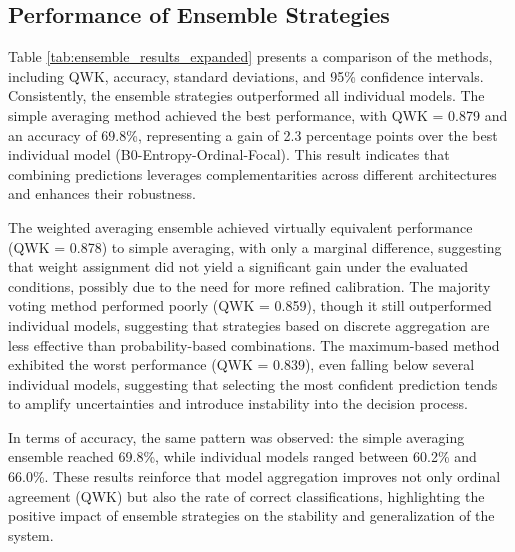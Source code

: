 \subsection{Performance of Ensemble Strategies}

Table \ref{tab:ensemble_results_expanded} presents a comparison of the methods, including QWK, accuracy, standard deviations, and 95\% confidence intervals. Consistently, the ensemble strategies outperformed all individual models. The simple averaging method achieved the best performance, with QWK = 0.879 and an accuracy of 69.8\%, representing a gain of 2.3 percentage points over the best individual model (B0-Entropy-Ordinal-Focal). This result indicates that combining predictions leverages complementarities across different architectures and enhances their robustness.

The weighted averaging ensemble achieved virtually equivalent performance (QWK = 0.878) to simple averaging, with only a marginal difference, suggesting that weight assignment did not yield a significant gain under the evaluated conditions, possibly due to the need for more refined calibration. The majority voting method performed poorly (QWK = 0.859), though it still outperformed individual models, suggesting that strategies based on discrete aggregation are less effective than probability-based combinations. The maximum-based method exhibited the worst performance (QWK = 0.839), even falling below several individual models, suggesting that selecting the most confident prediction tends to amplify uncertainties and introduce instability into the decision process.

In terms of accuracy, the same pattern was observed: the simple averaging ensemble reached 69.8\%, while individual models ranged between 60.2\% and 66.0\%. These results reinforce that model aggregation improves not only ordinal agreement (QWK) but also the rate of correct classifications, highlighting the positive impact of ensemble strategies on the stability and generalization of the system.

